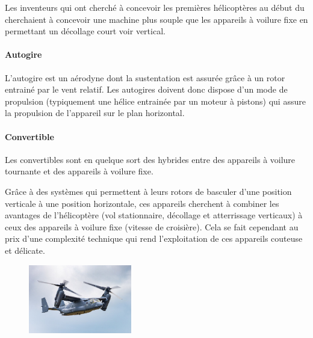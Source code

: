 		Les inventeurs qui ont cherché à concevoir les premières hélicoptères au début du  cherchaient à concevoir une machine plus souple que les appareils à voilure fixe en permettant un décollage court voir vertical. 
		
		
		\paragraph{Autogire}
		L'autogire  est un aérodyne dont la sustentation est assurée grâce à un rotor entrainé par le vent relatif. Les autogires doivent donc dispose d'un mode de propulsion (typiquement une hélice entrainée par un moteur à pistons) qui assure la propulsion de l'appareil sur le plan horizontal.
		
		
		\paragraph{Convertible}
		Les convertibles  sont en quelque sort des hybrides entre des appareils à voilure tournante et des appareils à voilure fixe.
		
		Grâce à des systèmes qui permettent à leurs rotors de basculer d'une position verticale à une position horizontale, ces appareils cherchent à combiner les avantages de l'hélicoptère (vol stationnaire, décollage et atterrissage verticaux) à ceux des appareils à voilure fixe (vitesse de croisière). Cela se fait cependant au prix d'une complexité technique qui rend l'exploitation de ces appareils couteuse et délicate.
		
	\begin{figure}[H]
  	\centering
    \includegraphics[width=0.4\textwidth]{01-EtudeAeronefs/img/tiltrotor.jpg}
	\end{figure}	
		
